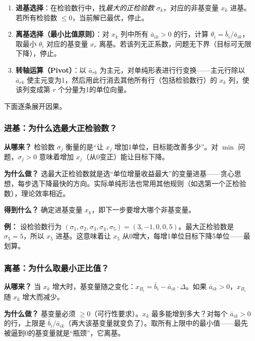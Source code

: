 \begin{enumerate}
  \item \textbf{进基选择}：在检验数行中，找\emph{最大的正检验数} $\sigma_k$，对应的非基变量 $x_k$ 进基。若所有检验数 $\le 0$，当前解已最优，停止。
  \item \textbf{离基选择（最小比值原则）}：对 $x_k$ 列中所有 $\bar{a}_{ik} > 0$ 的行，计算 $\theta_i = \bar{b}_i / \bar{a}_{ik}$，取最小 $\theta_i$ 对应的基变量 $x_r$ 离基。若该列无正系数，问题无下界（目标可无限下降），停止。
  \item \textbf{转轴运算（Pivot）}：以 $\bar{a}_{rk}$ 为主元，对单纯形表进行行变换——主元行除以 $\bar{a}_{rk}$ 使主元变为1，然后用此行消去其他所有行（包括检验数行）的 $x_k$ 列，使该列变成第 $r$ 个分量为1的单位向量。
\end{enumerate}

下面逐条展开因果。

\subsubsection{进基：为什么选最大正检验数？}

\textbf{从哪来？} 检验数 $\sigma_j$ 衡量的是“让 $x_j$ 增加1单位，目标能改善多少”。对 $\min$ 问题，$\sigma_j>0$ 意味着增加 $x_j$（从0变正）能让目标下降。

\textbf{为什么做？} 选最大正检验数就是选“单位增量收益最大”的变量进基——贪心思想，每步选下降最快的方向。实际单纯形法也常用其他规则（如选第一个正检验数），理论效率相近。

\textbf{得到什么？} 确定进基变量 $x_k$，即下一步要增大哪个非基变量。

\textbf{例：} 设检验数行为 $(\sigma_1,\sigma_2,\sigma_3,\sigma_4,\sigma_5) = (3,-1,0,0,5)$。最大正检验数是 $\sigma_5=5$，所以 $x_5$ 进基。这意味着让 $x_5$ 从0增大，每增1单位目标下降5单位——最划算。

\subsubsection{离基：为什么取最小正比值？}

\textbf{从哪来？} 当 $x_k$ 增大时，基变量随之变化：$x_{B_i} = \bar{b}_i - \bar{a}_{ik} \cdot \Delta$。如果 $\bar{a}_{ik}>0$，$x_{B_i}$ 随 $x_k$ 增大而减少。

\textbf{为什么做？} 基变量必须 $\ge 0$（可行性要求）。$x_k$ 最多能增到多大？对每个 $\bar{a}_{ik}>0$ 的行，上限是 $\bar{b}_i/\bar{a}_{ik}$（再大该基变量就变负了）。取所有上限中的最小值——最先被逼到0的基变量就是“瓶颈”，它离基。

